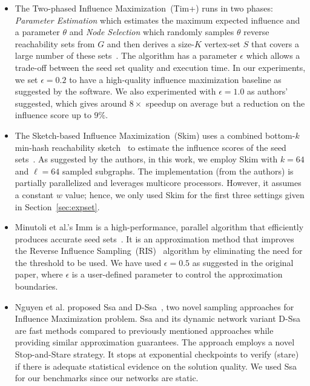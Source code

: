 \documentclass[review]{elsarticle}
\begin{document}
\begin{itemize} [leftmargin=0.3cm]
\item The Two-phased Influence Maximization~({\sc Tim+}) runs in two phases: {\em Parameter Estimation} which estimates the maximum expected influence and a parameter $\theta$ and {\em Node Selection} which randomly samples $\theta$ reverse reachability sets from $G$ and then derives a size-$K$ vertex-set $S$ that covers a large number of these sets~\cite{tim}. The algorithm has a parameter $\epsilon$ which allows a trade-off between the seed set quality and execution time. In our experiments, we set  $\epsilon=0.2$ to have a high-quality influence maximization baseline as suggested by the software. We also experimented with $\epsilon = 1.0$ as authors' suggested, which gives around $8\times$ speedup on average but a reduction on the influence score up to $9\%$.

\item The Sketch-based Influence Maximization~({\sc Skim}) uses a combined bottom-$k$ min-hash reachability sketch~\cite{bottomk} to estimate the influence scores of the seed sets~\cite{cohen2014sketch}. As suggested by the authors, in this work, we employ {\sc Skim} with $k = 64$ and $\ell = 64$ sampled subgraphs. The implementation (from the authors) is partially parallelized and leverages multicore processors. However, it  assumes a constant $w$ value; hence, we only used {\sc Skim} for the first three settings given in Section~\ref{sec:expset}.

\item Minutoli et al.'s {\sc Imm} is a high-performance, parallel algorithm that efficiently produces accurate seed sets~\cite{minutoli2019fast}. 
It is an approximation method that improves the Reverse Influence Sampling~(RIS)~\cite{borgs2014maximizing} algorithm by eliminating the need for the threshold to be used. %
We have used $\epsilon = 0.5$ as suggested in the original paper, where $\epsilon$ is a user-defined parameter to control the approximation boundaries.

\item Nguyen et al. proposed {\sc Ssa} and {\sc D-Ssa}~\cite{nguyen2016stop}, two novel sampling approaches for Influence Maximization problem. {\sc Ssa} and its dynamic network variant {\sc D-Ssa} are fast methods compared to previously mentioned approaches while providing similar approximation guarantees. The approach employs a novel Stop-and-Stare strategy. It stops at exponential checkpoints to verify (stare) if there is adequate statistical evidence on the solution quality. We used {\sc Ssa} for our benchmarks since our networks are static. 


\end{itemize}
\end{document}
